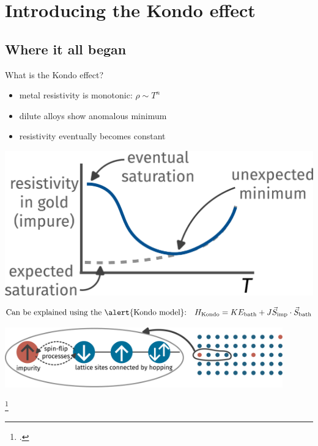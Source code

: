 \documentclass[10pt,aspectratio=169]{beamer}
\begin{document}
\section{Introducing the Kondo effect}
\subsection{Where it all began}

\begin{frame}{What is the Kondo effect?}
\begin{minipage}{0.5\textwidth}
\begin{itemize}
	\item metal resistivity is \alert{monotonic}: \(\rho \sim T^n\)\\[10pt]
	\item dilute alloys show anomalous \alert{minimum}\\[10pt]
	\item resistivity eventually becomes \alert{constant}
\end{itemize}
\end{minipage}
\hspace*{\fill}
\begin{minipage}{0.45\textwidth}
\centering
\includegraphics[width=\textwidth]{resistance_minimum.pdf}
\end{minipage}

\[\text{Can be explained using the \alert{Kondo model}:}\quad H_\text{Kondo} = KE_\text{bath} + J \vec{S}_\text{imp}\cdot\vec{S}_\text{bath}\]

\includegraphics[width=0.9\textwidth]{KondoModel.pdf}

\footcite{deHaas1939,Sarachik1964,Heeger1969}
\end{frame}
\end{document}
